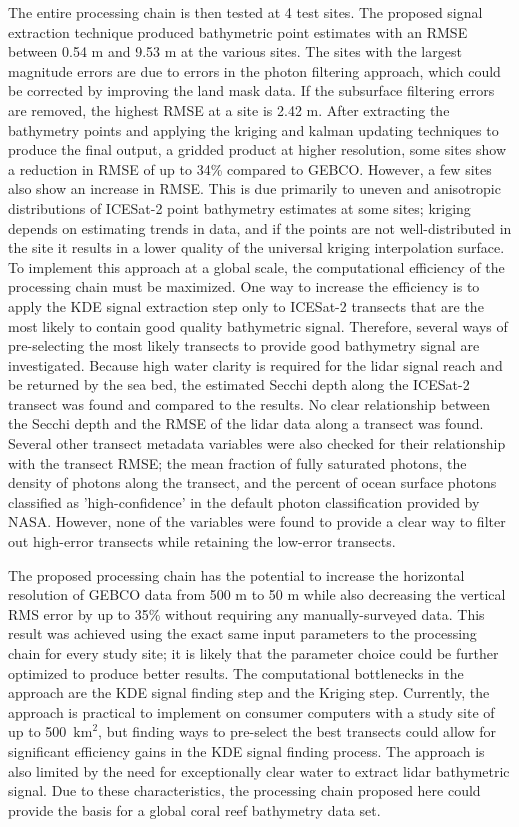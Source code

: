 The entire processing chain is then tested at 4 test sites. The proposed signal extraction technique produced bathymetric point estimates with an RMSE between 0.54 m and 9.53 m at the various sites. The sites with the largest magnitude errors are due to errors in the photon filtering approach, which could be corrected by improving the land mask data. If the subsurface filtering errors are removed, the highest RMSE at a site is 2.42 m. After extracting the bathymetry points and applying the kriging and kalman updating techniques to produce the final output, a gridded product at higher resolution, some sites show a reduction in RMSE of up to 34\% compared to GEBCO. However, a few sites also show an increase in RMSE. This is due primarily to uneven and anisotropic distributions of ICESat-2 point bathymetry estimates at some sites; kriging depends on estimating trends in data, and if the points are not well-distributed in the site it results in a lower quality of the universal kriging interpolation surface.
\vskip 0.1in
To implement this approach at a global scale, the computational efficiency of the processing chain must be maximized. One way to increase the efficiency is to apply the KDE signal extraction step only to ICESat-2 transects that are the most likely to contain good quality bathymetric signal. Therefore, several ways of pre-selecting the most likely transects to provide good bathymetry signal are investigated. Because high water clarity is required for the lidar signal reach and be returned by the sea bed, the estimated Secchi depth along the ICESat-2 transect was found and compared to the results. No clear relationship between the Secchi depth and the RMSE of the lidar data along a transect was found. Several other transect metadata variables were also checked for their relationship with the transect RMSE; the mean fraction of fully saturated photons, the density of photons along the transect, and the percent of ocean surface photons classified as 'high-confidence' in the default photon classification provided by NASA. However, none of the variables were found to provide a clear way to filter out high-error transects while retaining the low-error transects.
\vskip 0.1in

The proposed processing chain has the potential to increase the horizontal resolution of GEBCO data from 500 m to 50 m while also decreasing the vertical RMS error by up to 35\% without requiring any manually-surveyed data. This result was achieved using the exact same input parameters to the processing chain for every study site; it is likely that the parameter choice could be further optimized to produce better results. The computational bottlenecks in the approach are the KDE signal finding step and the Kriging step. Currently, the approach is practical to implement on consumer computers with a study site of up to 500~$\text{km}^2$, but finding ways to pre-select the best transects could allow for significant efficiency gains in the KDE signal finding process. The approach is also limited by the need for exceptionally clear water to extract lidar bathymetric signal. Due to these characteristics, the processing chain proposed here could provide the basis for a global coral reef bathymetry data set.
